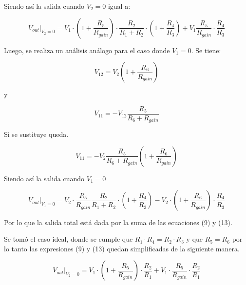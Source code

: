 \documentclass[12pt,A4paper,titlepage]{article}
\begin{document}
\bigskip
\hspace{1mm} Siendo así la salida cuando \(V_2 = 0\) igual a:

\bigskip
\begin{equation}
    V_{out}|_{V_2=0} = V_1 \cdot \left(1 + \frac{R_5}{R_{gain}}\right) \cdot \frac{R_2}{R_1 + R_2} \cdot \left(1 + \frac{R_4}{R_3}\right) + V_1 \frac{R_5}{R_{gain}} \cdot \frac{R_4}{R_3}
\end{equation}

\bigskip
\hspace{1mm} Luego, se realiza un análisis análogo para el caso donde \(V_1 = 0\). Se tiene:

\begin{equation}
    V_{12} = V_2 \left(1 + \frac{R_6}{R_{gain}}\right)
\end{equation}

\hspace{1mm} y

\begin{equation}
    V_{11} = -V_{12} \frac{R_5}{R_6 + R_{gain}}
\end{equation}

\bigskip
\hspace{1mm} Si se sustituye queda.

\begin{equation}
    V_{11} = -V_2 \frac{R_5}{R_6 + R_{gain}} \left(1 + \frac{R_6}{R_{gain}}\right)
\end{equation}

\bigskip
\hspace{1mm} Siendo así la salida cuando \(V_1 = 0\)

\bigskip
\begin{equation}
    V_{out}|_{V_1=0} = V_2 \cdot \frac{R_5}{R_{gain}} \frac{R_2}{R_1 + R_2} \cdot \left(1 + \frac{R_4}{R_3}\right)  - V_2 \cdot \left(1+\frac{R_6}{R_{gain}}\right) \cdot \frac{R_4}{R_3}
\end{equation}

\bigskip
\hspace{1mm} Por lo que la salida total está dada por la suma de las ecuaciones (9) y (13).

\bigskip
\hspace{1mm} Se tomó el caso ideal, donde se cumple que \(R_1 \cdot R_4 = R_2 \cdot R_3\) y que \(R_5 = R_6\) por lo tanto las expresiones (9) y (13) quedan simplificadas de la siguiente manera.

\begin{equation}
    V_{out}|_{V_2=0} = V_1 \cdot \left(1 + \frac{R_5}{R_{gain}}\right) \cdot \frac{R_2}{R_1} + V_1 \cdot \frac{R_5}{R_{gain}} \cdot \frac{R_2}{R_1}
\end{equation}
\end{document}
